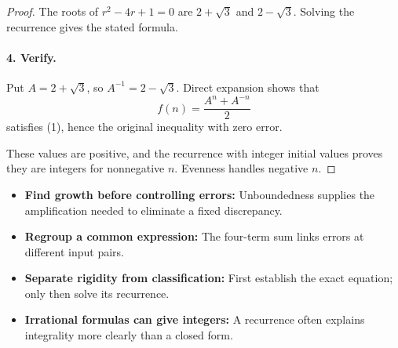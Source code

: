 \begin{dlsummary}[title={\bfseries Solution 52. The Almost-Cosine Sequence},breakable]
\begin{proof}
The roots of \(r^2-4r+1=0\) are \(2+\sqrt3\) and \(2-\sqrt3\). Solving the recurrence gives the stated formula.

\paragraph{4. Verify.}

Put \(A=2+\sqrt3\), so \(A^{-1}=2-\sqrt3\). Direct expansion shows that
\[
f(n)=\frac{A^n+A^{-n}}2
\]
satisfies (1), hence the original inequality with zero error.

These values are positive, and the recurrence with integer initial values proves they are integers for nonnegative \(n\). Evenness handles negative \(n\).
\end{proof}
\end{dlsummary}

\begin{takeaways}
\begin{itemize}
\item \textbf{Find growth before controlling errors:} Unboundedness supplies the amplification needed to eliminate a fixed discrepancy.
\item \textbf{Regroup a common expression:} The four-term sum links errors at different input pairs.
\item \textbf{Separate rigidity from classification:} First establish the exact equation; only then solve its recurrence.
\item \textbf{Irrational formulas can give integers:} A recurrence often explains integrality more clearly than a closed form.
\end{itemize}
\end{takeaways}
